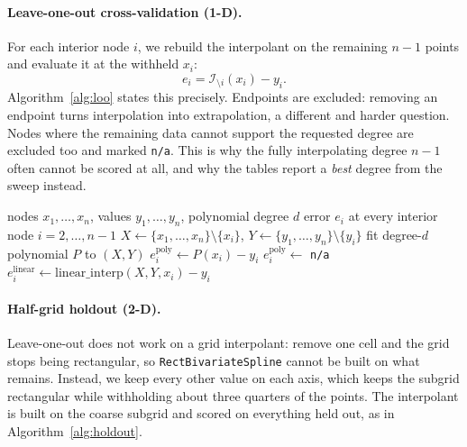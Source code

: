 \documentclass[sigconf,screen,nonacm]{acmart}
\begin{document}
\paragraph{Leave-one-out cross-validation (1-D).}
For each interior node $i$, we rebuild the interpolant on the remaining
$n-1$ points and evaluate it at the withheld $x_i$:
\begin{equation}
e_i = \mathcal{I}_{\setminus i}(x_i) - y_i .
\end{equation}
Algorithm~\ref{alg:loo} states this precisely. Endpoints are excluded:
removing an endpoint turns interpolation into extrapolation, a different and
harder question. Nodes where the remaining data cannot support the requested
degree are excluded too and marked \texttt{n/a}. This is why the fully
interpolating degree $n-1$ often cannot be scored at all, and why the tables
report a \emph{best} degree from the sweep instead.

\begin{algorithm}[!ht]
\caption{Leave-one-out cross-validation at the interior nodes}
\label{alg:loo}
\begin{algorithmic}[1]\small
\Require nodes $x_1,\dots,x_n$, values $y_1,\dots,y_n$, polynomial degree $d$
\Ensure error $e_i$ at every interior node $i=2,\dots,n-1$
  \State $X \gets \{x_1,\dots,x_n\} \setminus \{x_i\}$,\quad
         $Y \gets \{y_1,\dots,y_n\} \setminus \{y_i\}$
    \State fit degree-$d$ polynomial $P$ to $(X,Y)$
    \State $e_i^{\text{poly}} \gets P(x_i) - y_i$
  \Else
    \State $e_i^{\text{poly}} \gets$ \texttt{n/a}
  \EndIf
  \State $e_i^{\text{linear}} \gets \mathrm{linear\_interp}(X,Y,x_i) - y_i$
\EndFor
\end{algorithmic}
\end{algorithm}

\paragraph{Half-grid holdout (2-D).}
Leave-one-out does not work on a grid interpolant: remove one cell and the
grid stops being rectangular, so \texttt{RectBivariateSpline} cannot be built
on what remains. Instead, we keep every other value on each axis, which keeps
the subgrid rectangular while withholding about three quarters of the
points. The interpolant is built on the coarse subgrid and scored on
everything held out, as in Algorithm~\ref{alg:holdout}.
\end{document}
